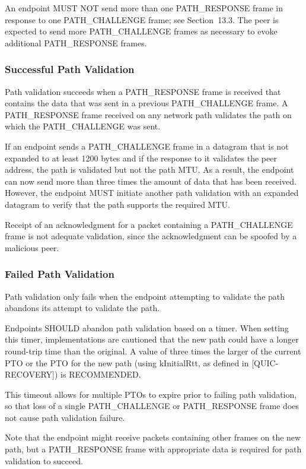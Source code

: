 \documentclass{article}
\begin{document}
An endpoint MUST NOT send more than one PATH\_RESPONSE frame in response to one PATH\_CHALLENGE frame; see Section~13.3.  The peer is expected to send more PATH\_CHALLENGE frames as necessary to evoke additional PATH\_RESPONSE frames.

\subsubsection{Successful Path Validation}

Path validation succeeds when a PATH\_RESPONSE frame is received that contains the data that was sent in a previous PATH\_CHALLENGE frame. A PATH\_RESPONSE frame received on any network path validates the path on which the PATH\_CHALLENGE was sent.

If an endpoint sends a PATH\_CHALLENGE frame in a datagram that is not expanded to at least 1200 bytes and if the response to it validates the peer address, the path is validated but not the path MTU.  As a result, the endpoint can now send more than three times the amount of data that has been received.  However, the endpoint MUST initiate another path validation with an expanded datagram to verify that the path supports the required MTU.

Receipt of an acknowledgment for a packet containing a PATH\_CHALLENGE frame is not adequate validation, since the acknowledgment can be spoofed by a malicious peer.

\subsubsection{Failed Path Validation}

Path validation only fails when the endpoint attempting to validate the path abandons its attempt to validate the path.

Endpoints SHOULD abandon path validation based on a timer.  When setting this timer, implementations are cautioned that the new path could have a longer round-trip time than the original.  A value of three times the larger of the current PTO or the PTO for the new path (using kInitialRtt, as defined in [QUIC-RECOVERY]) is RECOMMENDED.

This timeout allows for multiple PTOs to expire prior to failing path validation, so that loss of a single PATH\_CHALLENGE or PATH\_RESPONSE frame does not cause path validation failure.

Note that the endpoint might receive packets containing other frames on the new path, but a PATH\_RESPONSE frame with appropriate data is required for path validation to succeed.
\end{document}
